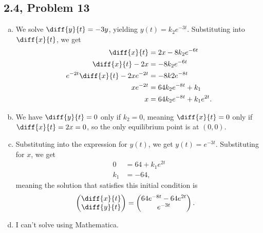 \documentclass[10pt]{mypackage}
\begin{document}
\subsection{2.4, Problem 13}%
\begin{enumerate}[(a)]
  \item We solve $\diff{y}{t} = -3y$, yielding $y(t) = k_2e^{-3t}$. Substituting into $\diff{x}{t}$, we get
    \begin{align*}
      \diff{x}{t} &= 2x - 8k_2e^{-6t}\\
      \diff{x}{t} - 2x &= -8k_2e^{-6t}\\
      e^{-2t}\diff{x}{t} - 2xe^{-2t} &= -8k2e^{-8t}\\
      xe^{-2t} &= 64k_2e^{-8t} + k_1\\
      x &= 64k_2e^{-8t} + k_1e^{2t}.
    \end{align*}
  \item We have $\diff{y}{t} = 0$ only if $k_2 = 0$, meaning $\diff{x}{t} = 0$ only if $\diff{x}{t}= 2x = 0$, so the only equilibrium point is at $(0,0)$.
  \item Substituting into the expression for $y(t)$, we get $y(t) = e^{-3t}$. Substituting for $x$, we get
    \begin{align*}
      0 &= 64 + k_1e^{2t}\\
      k_1 &= -64,
    \end{align*}
    meaning the solution that satisfies this initial condition is
    \begin{align*}
      \begin{pmatrix}\diff{x}{t}\\\diff{y}{t}\end{pmatrix} &= \begin{pmatrix}64e^{-8t} - 64e^{2t}\\e^{-3t}\end{pmatrix}.
    \end{align*}
  \item I can't solve using Mathematica.
\end{enumerate}
\end{document}
